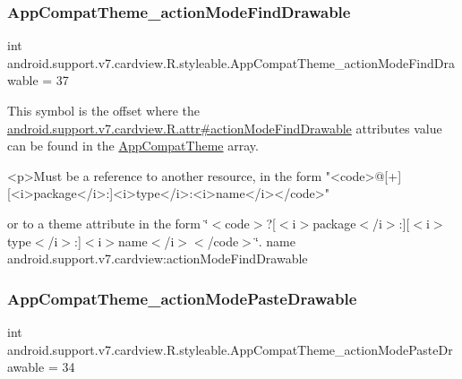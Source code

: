 \subsubsection{\texorpdfstring{App\+Compat\+Theme\+\_\+action\+Mode\+Find\+Drawable}{AppCompatTheme\_actionModeFindDrawable}}
{\footnotesize\ttfamily int android.\+support.\+v7.\+cardview.\+R.\+styleable.\+App\+Compat\+Theme\+\_\+action\+Mode\+Find\+Drawable = 37\hspace{0.3cm}{\ttfamily [static]}}

This symbol is the offset where the \hyperlink{classandroid_1_1support_1_1v7_1_1cardview_1_1R_1_1attr_a494f7701e17a6f850787e8abce6489ad}{android.\+support.\+v7.\+cardview.\+R.\+attr\#action\+Mode\+Find\+Drawable} attribute\textquotesingle{}s value can be found in the \hyperlink{classandroid_1_1support_1_1v7_1_1cardview_1_1R_1_1styleable_a52e6f69f954ecc2622d72c0b4d298938}{App\+Compat\+Theme} array.

\begin{DoxyVerb}      <p>Must be a reference to another resource, in the form "<code>@[+][<i>package</i>:]<i>type</i>:<i>name</i></code>"
\end{DoxyVerb}
 or to a theme attribute in the form \char`\"{}$<$code$>$?\mbox{[}$<$i$>$package$<$/i$>$\+:\mbox{]}\mbox{[}$<$i$>$type$<$/i$>$\+:\mbox{]}$<$i$>$name$<$/i$>$$<$/code$>$\char`\"{}.  name android.\+support.\+v7.\+cardview\+:action\+Mode\+Find\+Drawable \mbox{\label{classandroid_1_1support_1_1v7_1_1cardview_1_1R_1_1styleable_a585391b394200065853c38c37575811d}} 
\subsubsection{\texorpdfstring{App\+Compat\+Theme\+\_\+action\+Mode\+Paste\+Drawable}{AppCompatTheme\_actionModePasteDrawable}}
{\footnotesize\ttfamily int android.\+support.\+v7.\+cardview.\+R.\+styleable.\+App\+Compat\+Theme\+\_\+action\+Mode\+Paste\+Drawable = 34\hspace{0.3cm}{\ttfamily [static]}}

